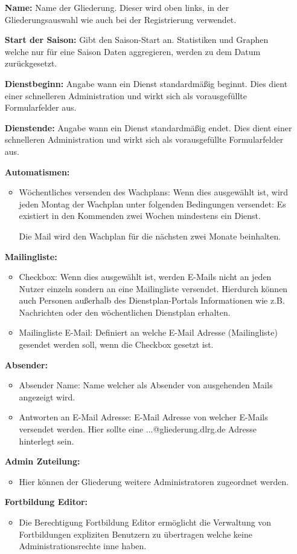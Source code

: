 \begin{itemize}
	\item[\textbf{Name:}] Name der Gliederung. Dieser wird oben links, in der Gliederungsauswahl wie auch bei der Registrierung verwendet.
	\item[\textbf{Start der Saison:}] Gibt den Saison-Start an. Statistiken und Graphen welche nur für eine Saison Daten aggregieren, werden zu dem Datum zurückgesetzt.
	\item[\textbf{Dienstbeginn:}] Angabe wann ein Dienst standardmäßig beginnt. Dies dient einer schnelleren Administration und wirkt sich als vorausgefüllte Formularfelder aus.
	\item[\textbf{Dienstende:}] Angabe wann ein Dienst standardmäßig endet. Dies dient einer schnelleren Administration und wirkt sich als vorausgefüllte Formularfelder aus.
	\item[\textbf{Automatismen:}]
	\begin{itemize}
		\item Wöchentliches versenden des Wachplans: Wenn dies ausgewählt ist, wird jeden Montag der Wachplan unter folgenden Bedingungen versendet: Es existiert in den Kommenden zwei Wochen mindestens ein Dienst. 
		
		\noindent Die Mail wird den Wachplan für die nächsten zwei Monate beinhalten.
	\end{itemize}
	\item[\textbf{Mailingliste:}]
	\begin{itemize}
		\item Checkbox: Wenn dies ausgewählt ist, werden E-Mails nicht an jeden Nutzer einzeln sondern an eine Mailingliste versendet. Hierdurch können auch Personen außerhalb des Dienstplan-Portals Informationen wie z.B. Nachrichten oder den wöchentlichen Dienstplan erhalten.
		\item Mailingliste E-Mail: Definiert an welche E-Mail Adresse (Mailingliste) gesendet werden soll, wenn die Checkbox gesetzt ist.
	\end{itemize}
	\item[\textbf{Absender:}]
	\begin{itemize}
		\item Absender Name: Name welcher als Absender von ausgehenden Mails angezeigt wird.
		\item Antworten an E-Mail Adresse: E-Mail Adresse von welcher E-Mails versendet werden. Hier sollte eine ...@gliederung.dlrg.de Adresse hinterlegt sein.
	\end{itemize}
	\item[\textbf{Admin Zuteilung:}]
	\begin{itemize}
		\item Hier können der Gliederung weitere Administratoren zugeordnet werden. 
	\end{itemize}
	\item[\textbf{Fortbildung Editor:}]
	\begin{itemize}
		\item Die Berechtigung Fortbildung Editor ermöglicht die Verwaltung von Fortbildungen expliziten Benutzern zu übertragen welche keine Administrationsrechte inne haben.
	\end{itemize}
\end{itemize}

